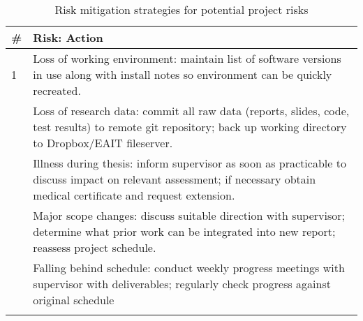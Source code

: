 \documentclass[pdftex,12pt,a4paper]{article}
\begin{document}
\begin{table}[H]
	\begin{center}
		\begin{tabularx}{\textwidth}{p{}X}
			\toprule
			\# & Risk: Action \\
			\midrule
			1 & Loss of working environment:
			maintain list of software versions in use along with install notes so environment can be quickly recreated. \\
			\addlinespace
			2 & Loss of research data:
			commit all raw data (reports, slides, code, test results) to remote git repository; back up working directory to Dropbox/EAIT fileserver. \\
			\addlinespace
			3 & Illness during thesis:
			inform supervisor as soon as practicable to discuss impact on relevant assessment; if necessary obtain medical certificate and request extension. \\
			\addlinespace
			4 & Major scope changes:
			discuss suitable direction with supervisor; determine what prior work can be integrated into new report; reassess project schedule. \\
			\addlinespace
			5 & Falling behind schedule:
			conduct weekly progress meetings with supervisor with deliverables; regularly check progress against original schedule \\
			\addlinespace
			\bottomrule
		\end{tabularx}
		\caption{Risk mitigation strategies for potential project risks}
		\label{table:mitigation}
	\end{center}
\end{table}

\newpage 
{}


\end{document}
